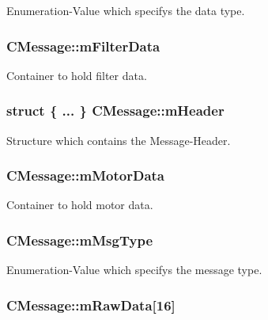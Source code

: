 Enumeration-\/\-Value which specifys the data type. 

\subsubsection[{m\-Filter\-Data}]{ C\-Message\-::m\-Filter\-Data}\label{classCMessage_aff84d3f0786990a8690f4456188a3917}


Container to hold filter data. 

\subsubsection[{m\-Header}]{\setlength{\rightskip}{0pt plus 5cm}struct \{ ... \}   C\-Message\-::m\-Header\hspace{0.3cm}{\ttfamily [private]}}\label{classCMessage_a1ddcb76fe4c9891411985772506f5ec5}


Structure which contains the Message-\/\-Header. 

\subsubsection[{m\-Motor\-Data}]{ C\-Message\-::m\-Motor\-Data}\label{classCMessage_ad2fce7e2f515ec1ffbb7f761d04f6650}


Container to hold motor data. 

\subsubsection[{m\-Msg\-Type}]{ C\-Message\-::m\-Msg\-Type}\label{classCMessage_a5472c05eeeb0cc366361aeee6cdb71ad}


Enumeration-\/\-Value which specifys the message type. 

\subsubsection[{m\-Raw\-Data}]{ C\-Message\-::m\-Raw\-Data[16]}\label{classCMessage_ad2da1166e19ca8ae5fc162700c588875}


